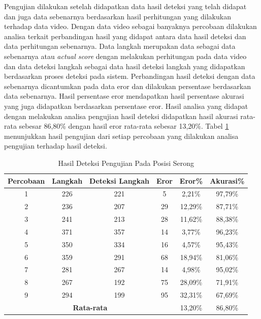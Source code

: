Pengujian dilakukan setelah didapatkan data hasil deteksi yang telah didapat dan juga data sebenarnya berdasarkan hasil perhitungan yang dilakukan terhadap data video. Dengan data video sebagai banyaknya percobaan dilakukan analisa terkait perbandingan hasil yang didapat antara data hasil deteksi dan data perhitungan sebenarnya. Data langkah merupakan data sebagai data sebenarnya atau \emph{actual score} dengan melakukan perhitungan pada data video dan data deteksi langkah sebagai data hasil deteksi langkah yang didapatkan berdasarkan proses deteksi pada sistem. Perbandingan hasil deteksi dengan data sebenarnya dicantumkan pada data eror dan dilakukan persentase berdasarkan data sebenarnya. Hasil persentase eror mendapatkan hasil persentase akurasi yang juga didapatkan berdasarkan persentase eror. Hasil analisa yang didapat dengan melakukan analisa pengujian hasil deteksi didapatkan hasil akurasi rata-rata sebesar 86,80\% dengan hasil eror rata-rata sebesar 13,20\%. Tabel \ref{tb:PengujianPosisiSerongAnalisaDeteksi} menunjukkan hasil pengujian dari setiap percobaan yang dilakukan analisa pengujian terhadap hasil deteksi.

\begin{longtable}{|c|c|c|c|c|c|}
  \caption{Hasil Deteksi Pengujian Pada Posisi Serong}
  \label{tb:PengujianPosisiSerongAnalisaDeteksi}                                   \\
  \hline
  \rowcolor[HTML]{C0C0C0}
  \textbf{Percobaan} & \textbf{Langkah} & \textbf{Deteksi Langkah} & \textbf{Eror} & \textbf{Eror\%} & \textbf{Akurasi\%} \\
  \hline
  1   & 226   & 221  & 5   & 2,21\%    & 97,79\%   \\
  \hline
  2   & 236   & 207  & 29  & 12,29\%   & 87,71\%   \\
  \hline
  3   & 241   & 213  & 28  & 11,62\%   & 88,38\%   \\
  \hline
  4   & 371   & 357  & 14  & 3,77\%    & 96,23\%   \\
  \hline
  5   & 350   & 334  & 16  & 4,57\%    & 95,43\%   \\
  \hline
  6   & 359   & 291  & 68  & 18,94\%   & 81,06\%   \\
  \hline
  7   & 281   & 267  & 14  & 4,98\%    & 95,02\%   \\
  \hline
  8   & 267   & 192  & 75  & 28,09\%   & 71,91\%   \\
  \hline
  9   & 294   & 199  & 95  & 32,31\%   & 67,69\%   \\
  \hline

  \multicolumn{4}{|c|}{\textbf{Rata-rata}} & 13,20\% & 86,80\% \\
  \hline
\end{longtable}

